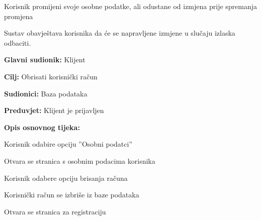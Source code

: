 \begin{packed_item}
\begin{packed_item}
\begin{packed_enum}
			
		\end{packed_enum}
		
		\item[5.a] Korisnik promijeni svoje osobne podatke, ali odustane od izmjena prije spremanja promjena
		\item[] \begin{packed_enum}
			
			\item Sustav obavještava korisnika da će se napravljene izmjene u slučaju izlaska odbaciti.
			
			
		\end{packed_enum}
		
	\end{packed_item}
\end{packed_item}

\noindent {}
\begin{packed_item}
	
	\item \textbf{Glavni sudionik: }Klijent
	\item  \textbf{Cilj:} Obrisati korisnički račun
	\item  \textbf{Sudionici:} Baza podataka
	\item  \textbf{Preduvjet:} Klijent je prijavljen
	\item  \textbf{Opis osnovnog tijeka:}
	
	\item[] \begin{packed_enum}
		
		\item Korisnik odabire opciju ”Osobni podatci”
		\item Otvara se stranica s osobnim podacima korisnika
		\item Korisnik odabere opciju brisanja računa
		\item Korisnički račun se izbriše iz baze podataka
		\item Otvara se stranica za registraciju
		
	\end{packed_enum}
	
\end{packed_item}


